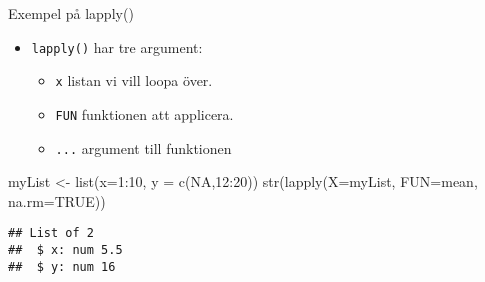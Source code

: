 \documentclass[
  11pt,
  ignorenonframetext,
]{beamer}
\newenvironment{Shaded}{\begin{snugshade}}{\end{snugshade}}
\newcommand{\AttributeTok}[1]{\textcolor[rgb]{0.77,0.63,0.00}{#1}}
\newcommand{\ConstantTok}[1]{\textcolor[rgb]{0.00,0.00,0.00}{#1}}
\newcommand{\DecValTok}[1]{\textcolor[rgb]{0.00,0.00,0.81}{#1}}
\newcommand{\FunctionTok}[1]{\textcolor[rgb]{0.00,0.00,0.00}{#1}}
\newcommand{\NormalTok}[1]{#1}
\newcommand{\OtherTok}[1]{\textcolor[rgb]{0.56,0.35,0.01}{#1}}
\newcommand{\SpecialCharTok}[1]{\textcolor[rgb]{0.00,0.00,0.00}{#1}}
\providecommand{\tightlist}{%
  \setlength{\itemsep}{0pt}\setlength{\parskip}{0pt}}
\begin{document}
\begin{frame}[fragile]{Exempel på lapply()}
\protect\hypertarget{exempel-puxe5-lapply}{}
\begin{itemize}
\tightlist
\item
  \texttt{lapply()} har tre argument:

  \begin{itemize}
  \tightlist
  \item
    \texttt{x} listan vi vill loopa över.
  \item
    \texttt{FUN} funktionen att applicera.
  \item
    \texttt{...} argument till funktionen
  \end{itemize}
\end{itemize}

\begin{Shaded}
\begin{Highlighting}[]
\NormalTok{myList }\OtherTok{\textless{}{-}} \FunctionTok{list}\NormalTok{(}\AttributeTok{x=}\DecValTok{1}\SpecialCharTok{:}\DecValTok{10}\NormalTok{, }\AttributeTok{y =} \FunctionTok{c}\NormalTok{(}\ConstantTok{NA}\NormalTok{,}\DecValTok{12}\SpecialCharTok{:}\DecValTok{20}\NormalTok{))}
\FunctionTok{str}\NormalTok{(}\FunctionTok{lapply}\NormalTok{(}\AttributeTok{X=}\NormalTok{myList, }\AttributeTok{FUN=}\NormalTok{mean, }\AttributeTok{na.rm=}\ConstantTok{TRUE}\NormalTok{))}
\end{Highlighting}
\end{Shaded}

\begin{verbatim}
## List of 2
##  $ x: num 5.5
##  $ y: num 16
\end{verbatim}


\end{frame}
\end{document}
